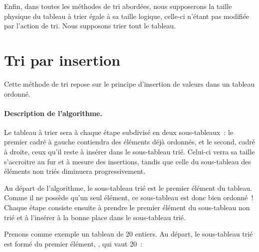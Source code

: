 	Enfin, dans toutes les méthodes de tri abordées, nous supposerons la taille
	physique du tableau à trier égale à sa taille logique, celle-ci n’étant pas
	modifiée par l’action de tri. Nous supposons trier tout le tableau. 



\clearpage
\section{Tri par insertion}
\label{chap:tri-insertion}

	Cette méthode de tri repose sur le principe d’insertion de valeurs dans
	un tableau ordonné. 

	\paragraph{Description de l’algorithme.}
	
	Le tableau à trier sera à chaque étape subdivisé en deux sous-tableaux~:
	le premier cadré à gauche contiendra des éléments déjà ordonnés, et le
	second, cadré à droite, ceux qu’il reste à insérer dans le sous-tableau
	trié. Celui-ci verra sa taille s’accroitre au fur et à mesure des
	insertions, tandis que celle du sous-tableau des éléments non triés
	diminuera progressivement.

	Au départ de l’algorithme, le sous-tableau trié est le premier élément
	du tableau. Comme il ne possède qu’un seul élément, ce sous-tableau est
	donc bien ordonné~! Chaque étape consiste ensuite à prendre le premier
	élément du sous-tableau non trié et à l’insérer à la bonne place dans
	le sous-tableau trié.

	Prenons comme exemple un tableau  de 20 entiers. 	
	Au départ, le sous-tableau trié est formé du premier élément, 
	, qui vaut 20~:

